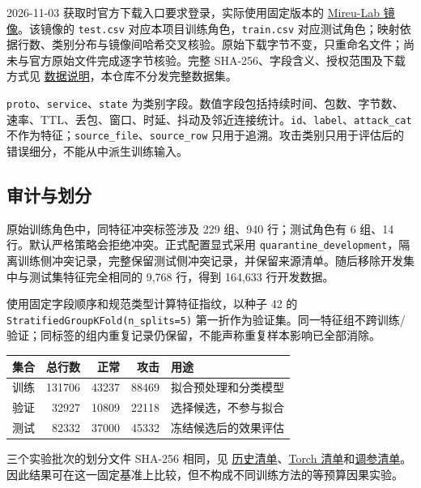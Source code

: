 \documentclass[UTF8,a4paper,11pt,fontset=fandol]{ctexart}
\newcounter{none}
\begin{document}
2026-11-03 获取时官方下载入口要求登录，实际使用固定版本的
\href{https://huggingface.co/datasets/Mireu-Lab/UNSW-NB15/tree/3eb02c4a0a29866b7abcb5ef77c45cf4fcc8f6b0}{Mireu-Lab
镜像}。该镜像的 \texttt{test.csv} 对应本项目训练角色，\texttt{train.csv}
对应测试角色；映射依据行数、类别分布与镜像间哈希交叉核验。原始下载字节不变，只重命名文件；尚未与官方原始文件完成逐字节核验。完整
SHA-256、字段含义、授权范围及下载方式见
\href{https://github.com/ZureTz/ml-network-intrusion-detection/blob/master/reports/dataset.md}{数据说明}，本仓库不分发完整数据集。

\texttt{proto}、\texttt{service}、\texttt{state}
为类别字段。数值字段包括持续时间、包数、字节数、速率、TTL、丢包、窗口、时延、抖动及邻近连接统计。\texttt{id}、\texttt{label}、\texttt{attack\_cat}
不作为特征；\texttt{source\_file}、\texttt{source\_row}
只用于追溯。攻击类别只用于评估后的错误细分，不能从中派生训练输入。

\subsection{审计与划分}\label{ux5ba1ux8ba1ux4e0eux5212ux5206}

原始训练角色中，同特征冲突标签涉及 229 组、940 行；测试角色有 6 组、14
行。默认严格策略会拒绝冲突。正式配置显式采用
\texttt{quarantine\_development}，隔离训练侧冲突记录，完整保留测试侧冲突记录，并保留来源清单。随后移除开发集中与测试集特征完全相同的
9,768 行，得到 164,633 行开发数据。

使用固定字段顺序和规范类型计算特征指纹，以种子 42 的
\nolinkurl{StratifiedGroupKFold(n_splits=5)}
第一折作为验证集。同一特征组不跨训练/验证；同标签的组内重复记录仍保留，不能声称重复样本影响已全部消除。


{\def\LTcaptype{none} %
\begin{longtable}[]{@{}lrrrl@{}}
\toprule\noalign{}
集合 & 总行数 & 正常 & 攻击 & 用途 \\
\midrule\noalign{}
\endhead
\bottomrule\noalign{}
\endlastfoot
训练 & 131706 & 43237 & 88469 & 拟合预处理和分类模型 \\
验证 & 32927 & 10809 & 22118 & 选择候选，不参与拟合 \\
测试 & 82332 & 37000 & 45332 & 冻结候选后的效果评估 \\
\end{longtable}
}

三个实验批次的划分文件 SHA-256 相同，见
\href{https://github.com/ZureTz/ml-network-intrusion-detection/blob/master/reports/results/full-20261103/data/manifest.json}{历史清单}、\href{https://github.com/ZureTz/ml-network-intrusion-detection/blob/master/reports/results/torch-full-20261105/data/manifest.json}{Torch
清单}和\href{https://github.com/ZureTz/ml-network-intrusion-detection/blob/master/reports/results/torch-tune-20261105/data/manifest.json}{调参清单}。因此结果可在这一固定基准上比较，但不构成不同训练方法的等预算因果实验。
\end{document}
